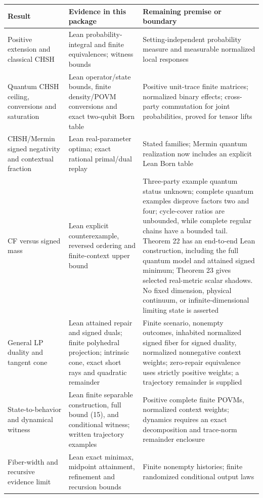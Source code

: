 \documentclass[
]{article}
\begin{document}
\begin{longtable}[]{@{}
  >{\raggedright\arraybackslash}p{}
  >{\raggedright\arraybackslash}p{}
  >{\raggedright\arraybackslash}p{}@{}}
\toprule\noalign{}
\begin{minipage}[b]{\linewidth}\raggedright
Result
\end{minipage} & \begin{minipage}[b]{\linewidth}\raggedright
Evidence in this package
\end{minipage} & \begin{minipage}[b]{\linewidth}\raggedright
Remaining premise or boundary
\end{minipage} \\
\midrule\noalign{}
\endhead
\bottomrule\noalign{}
\endlastfoot
Positive extension and classical CHSH & Lean probability-integral and finite equivalences; witness bounds & Setting-independent probability measure and measurable normalized local responses \\
Quantum CHSH ceiling, conversions and saturation & Lean operator/state bounds, finite density/POVM conversions and exact two-qubit Born table & Positive unit-trace finite matrices; normalized binary effects; cross-party commutation for joint probabilities, proved for tensor lifts \\
CHSH/Mermin signed negativity and contextual fraction & Lean real-parameter optima; exact rational primal/dual replay & Stated families; Mermin quantum realization now includes an explicit Lean Born table \\
CF versus signed mass & Lean explicit counterexample, reversed ordering and finite-context upper bound & Three-party example quantum status unknown; complete quantum examples disprove factors two and four; cycle-cover ratios are unbounded, while complete regular chains have a bounded tail. Theorem 22 has an end-to-end Lean construction, including the full quantum model and attained signed minimum; Theorem 23 gives selected real-metric scalar shadows. No fixed dimension, physical continuum, or infinite-dimensional limiting state is asserted \\
General LP duality and tangent cone & Lean attained repair and signed duals; finite polyhedral projection; intrinsic cone, exact short rays and quadratic remainder & Finite scenario, nonempty outcomes, inhabited normalized signed fiber for signed duality, normalized nonnegative context weights; zero-repair equivalence uses strictly positive weights; a trajectory remainder is supplied \\
State-to-behavior and dynamical witness & Lean finite separable construction, full bound (15), and conditional witness; written trajectory examples & Positive complete finite POVMs, normalized context weights; dynamics requires an exact decomposition and trace-norm remainder enclosure \\
Fiber-width and recursive evidence limit & Lean exact minimax, midpoint attainment, refinement and recursion bounds & Finite nonempty histories; finite randomized conditional output laws \\
\end{longtable}
\end{document}
